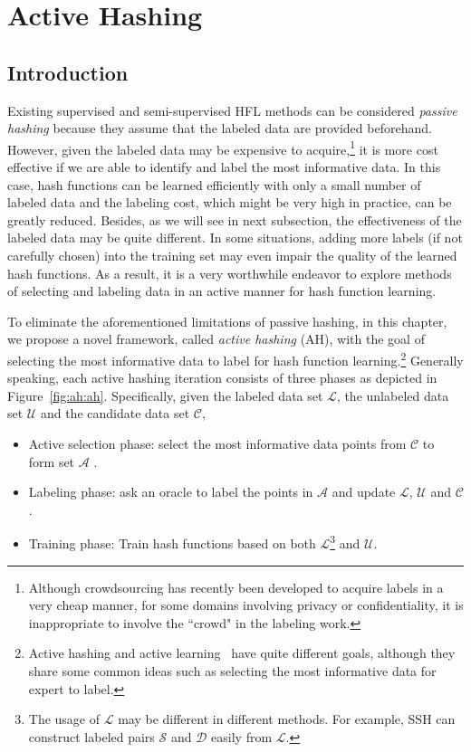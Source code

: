 
\chapter{Active Hashing}
\label{chap:ah}

\section{Introduction}

Existing supervised and semi-supervised \mbox{HFL} methods can be considered \textit{passive hashing} because they assume that the labeled data are provided beforehand. However, given the labeled data may be expensive to acquire,\footnote{Although crowdsourcing has recently been developed to acquire labels in a very cheap manner, for some domains involving privacy or confidentiality, it is inappropriate to involve the ``crowd" in the labeling work.} it is more cost effective if we are able to identify and label the most informative data. In this case, hash functions can be learned efficiently with only a small number of labeled data and the labeling cost, which might be very high in practice, can be greatly reduced. Besides, as we will see in next subsection, the effectiveness of the labeled data may be quite different. In some situations, adding more labels (if not carefully chosen) into the training set may even impair the quality of the learned hash functions. As a result, it is a very worthwhile endeavor to explore methods of selecting and labeling data in an active manner for hash function learning.

To eliminate the aforementioned limitations of passive hashing, in this chapter, we propose a novel framework, called \textit{active hashing} (\mbox{AH}), with the goal of selecting the most informative data to label for hash function learning.\footnote{Active hashing and active learning~\cite{Angluin1988mlj,cohn1994mlj} have quite different goals, although they share some common ideas such as selecting the most informative data for expert to label.} Generally speaking, each active hashing iteration consists of three phases as depicted in Figure~\ref{fig:ah:ah}. Specifically, given the labeled data set $\mathcal{L}$, the unlabeled data set $\mathcal{U}$ and the candidate data set $\mathcal{C}$,
\begin{itemize}
  \item Active selection phase: select the most informative data points from $\mathcal{C}$ to form set $\mathcal{A}$ .
  \item Labeling phase: ask an oracle to label the points in $\mathcal{A}$ and update  $\mathcal{L}$,  $\mathcal{U}$ and  $\mathcal{C}$.
  \item Training phase: Train hash functions based on both $\mathcal{L}$\footnote{The usage of $\mathcal{L}$ may be different in different methods. For example, \mbox{SSH} can construct labeled pairs $\mathcal{S}$ and $\mathcal{D}$  easily from $\mathcal{L}$.} and $\mathcal{U}$.
\end{itemize}

